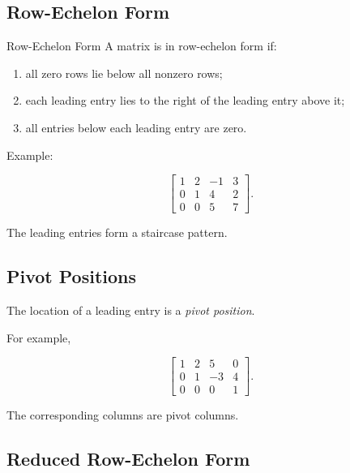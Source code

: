 \subsection{Row-Echelon Form}
\label{subsec:row-echelon-form}

\begin{definitionbox}{Row-Echelon Form}
A matrix is in row-echelon form if:
\begin{enumerate}
    \item all zero rows lie below all nonzero rows;
    \item each leading entry lies to the right of the leading entry above it;
    \item all entries below each leading entry are zero.
\end{enumerate}
\end{definitionbox}

Example:

\[ \begin{bmatrix}
1&2&-1&3\\
0&1&4&2\\
0&0&5&7
\end{bmatrix}. \]

The leading entries form a staircase pattern.

\subsection{Pivot Positions}
\label{subsec:pivot-positions}

The location of a leading entry is a \emph{pivot position}.

For example,

\[
\begin{bmatrix}
\boxed{1}&2&5&0\\
0&\boxed{1}&-3&4\\
0&0&0&\boxed{1}
\end{bmatrix}.
\]

The corresponding columns are pivot columns.

\subsection{Reduced Row-Echelon Form}
\label{subsec:reduced-row-echelon-form}

